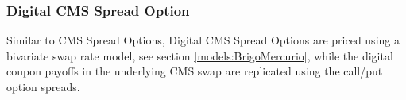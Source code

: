 \subsubsection{Digital CMS Spread Option}
\label{pricing:ir_digitalcmsspreadoption}

Similar to CMS Spread Options, Digital CMS Spread Options are priced using a bivariate swap rate model, see
section \ref{models:BrigoMercurio}, while the digital coupon payoffs in the underlying CMS swap are replicated using the
call/put option spreads.
